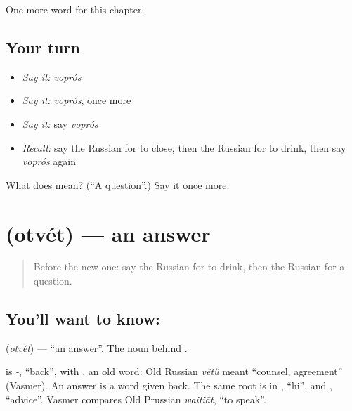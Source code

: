 \begin{grammarlens}[title={What you've built}]
One more word for this chapter.
\end{grammarlens}

\subsection*{Your turn}
\begin{itemize}
\raggedright
  \item \emph{Say it:} \emph{voprós}
  \item \emph{Say it:} \emph{voprós}, once more
  \item \emph{Say it:} say \emph{voprós}
  \item \emph{Recall:} say the Russian for to close, then the Russian for to drink, then say \emph{voprós} again
\end{itemize}

\begin{tcolorbox}[breakable,colback=teal!4,colframe=teal!35!black,title={Before you move on}]
What does  mean? (\textquotedblleft{}A question\textquotedblright{}.) Say it once more.
\end{tcolorbox}
\section[\texorpdfstring{\ru{ответ} (otvét)}{ответ (otvét)}]{ (otvét) — an answer}

\label{lesson:RU-C42-answer}



\begin{quote}
Before the new one: say the Russian for to drink, then the Russian for a question.
\end{quote}

\subsection*{You'll want to know: }
\textbf{} (\emph{otvét}) — \textquotedblleft{}an answer\textquotedblright{}. The noun behind \textbf{}.

\begin{cousinweb}
\textbf{} is \emph{-}, \textquotedblleft{}back\textquotedblright{}, with \emph{}, an old word: Old Russian \emph{větŭ} meant \textquotedblleft{}counsel, agreement\textquotedblright{} (Vasmer). An answer is a word given back. The same root is in \emph{}, \textquotedblleft{}hi\textquotedblright{}, and \emph{}, \textquotedblleft{}advice\textquotedblright{}. Vasmer compares Old Prussian \emph{waitiāt}, \textquotedblleft{}to speak\textquotedblright{}.
\end{cousinweb}

